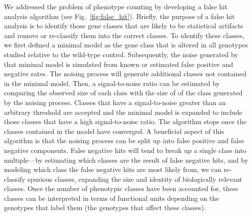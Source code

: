 \documentclass[10pt, twocolumn]{article}
\begin{document}
We addressed the problem of phenotype counting by developing a false hit
analysis algorithm (see Fig.~\ref{fig:false_hit}). Briefly, the purpose of a
false hit analysis is to identify those gene classes that are likely to be
statistical artifacts and remove or re-classify them into the correct classes.
To identify these classes, we first defined a minimal model as the gene class
that is altered in all genotypes studied relative to the wild-type control.
Subsequently, the noise generated by that minimal model is simulated from known
or estimated false positive and negative rates. The noising process will
generate additional classes not contained in the minimal model. Then, a
signal-to-noise ratio can be estimated by comparing the observed size of each
class with the size of of the class generated by the noising process. Classes
that have a signal-to-noise greater than an arbitrary threshold are accepted and
the minimal model is expanded to include those classes that have a high
signal-to-noise ratio. The algorithm stops once the classes contained in the
model have converged. A beneficial aspect of this algorithm is that the noising
process can be split up into false positive and false negative components. False
negative hits will tend to break up a single class into multiple---by estimating
which classes are the result of false negative hits, and by modeling which class
the false negative hits are most likely from, we can re-classify spurious
classes, expanding the size and identity of biologically relevant classes. Once
the number of phenotypic classes have been accounted for, these classes can be
interpreted in terms of functional units depending on the genotypes that label
them (the genotypes that affect these classes).
\end{document}
